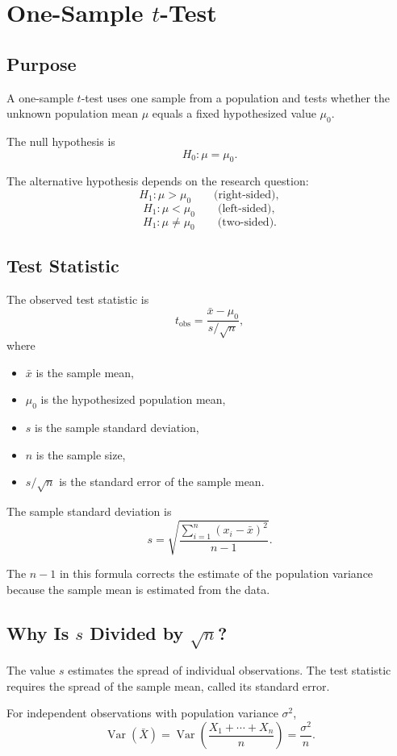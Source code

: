 \documentclass[11pt]{article}
\begin{document}
\section{One-Sample \(t\)-Test}

\subsection{Purpose}
A one-sample \(t\)-test uses one sample from a population and tests whether the unknown population mean \(\mu\) equals a fixed hypothesized value \(\mu_0\).

The null hypothesis is
\[
H_0:\mu=\mu_0.
\]

The alternative hypothesis depends on the research question:
\[
H_1:\mu>\mu_0 \qquad \text{(right-sided)},
\]
\[
H_1:\mu<\mu_0 \qquad \text{(left-sided)},
\]
\[
H_1:\mu\neq\mu_0 \qquad \text{(two-sided)}.
\]

\subsection{Test Statistic}
The observed test statistic is
\[
t_{\mathrm{obs}}=\frac{\bar{x}-\mu_0}{s/\sqrt{n}},
\]
where
\begin{itemize}[noitemsep]
    \item \(\bar{x}\) is the sample mean,
    \item \(\mu_0\) is the hypothesized population mean,
    \item \(s\) is the sample standard deviation,
    \item \(n\) is the sample size,
    \item \(s/\sqrt{n}\) is the standard error of the sample mean.
\end{itemize}

The sample standard deviation is
\[
s=\sqrt{\frac{\sum_{i=1}^{n}(x_i-\bar{x})^2}{n-1}}.
\]

The \(n-1\) in this formula corrects the estimate of the population variance because the sample mean is estimated from the data.

\subsection{Why Is \(s\) Divided by \(\sqrt{n}\)?}
The value \(s\) estimates the spread of individual observations. The test statistic requires the spread of the sample mean, called its standard error.

For independent observations with population variance \(\sigma^2\),
\[
\operatorname{Var}(\bar{X})
=\operatorname{Var}\left(\frac{X_1+\cdots+X_n}{n}\right)
=\frac{\sigma^2}{n}.
\]
\end{document}
